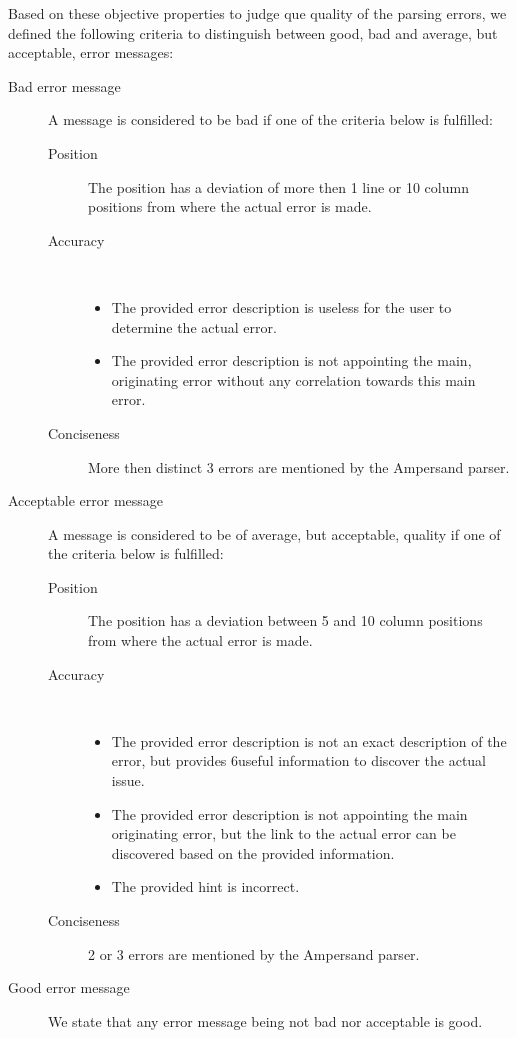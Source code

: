 %
Based on these objective properties to judge que quality of the parsing errors, we defined the following criteria to distinguish between good, bad and average, but acceptable, error messages:
%
\begin{description}
	\item [Bad error message] A message is considered to be bad if one of the criteria below is fulfilled:
		\begin{description}
			\item [Position]
			The position has a deviation of more then 1 line or 10 column positions from where the actual error is made.
			\item [Accuracy]~
				\begin{itemize}
					\item 	The provided error description is useless for the user to determine the actual error.
					\item 	The provided error description is not appointing the main, originating error without any correlation towards this main error.
				\end {itemize}
			\item[Conciseness]
			More then distinct 3 errors are mentioned by the Ampersand parser.
		\end {description}
	\item [Acceptable error message] A message is considered to be of average, but acceptable, quality if one of the criteria below is fulfilled:
		\begin{description}
			\item [Position]
			The position has a deviation between 5 and 10 column positions from where the actual error is made.
			\item [Accuracy]~
				\begin{itemize}
					\item 	The provided error description is not an exact description of the error, but provides 6useful information to discover the actual issue.
					\item 	The provided error description is not appointing the main originating error, but the link to the actual error can be discovered based on the provided information.
					\item 	The provided hint is incorrect.
				\end {itemize}
			\item[Conciseness]
			2 or 3 errors are mentioned by the Ampersand parser.
		\end {description}
		
	\item [Good error message] We state that any error message being not bad nor acceptable is good.
\end {description}

